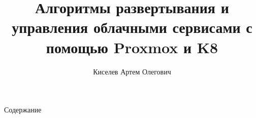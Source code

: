 \documentclass[xetex,a4paper,12pt]{extarticle}
\title{Алгоритмы развертывания и управления облачными сервисами с помощью Proxmox и K8}
\author{Киселев Артем Олегович}
\date{\the\year}
\begin{document}
    \titulnik


    \setcounter{page}{2}

    Содержание  
    \tableofcontents
    \clearpage

    
    
    
    

    
    
\end{document}
